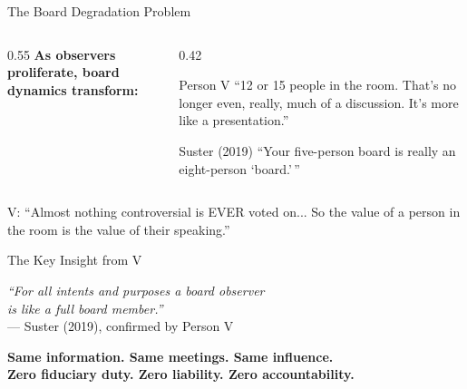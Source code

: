 \documentclass[aspectratio=169,12pt]{beamer}
\begin{document}
\begin{frame}{The Board Degradation Problem}
\begin{columns}
\begin{column}{0.55\textwidth}
\textbf{As observers proliferate, board dynamics transform:}
\vspace{0.5em}

\end{column}
\begin{column}{0.42\textwidth}
\begin{block}{Person V}
\small
``12 or 15 people in the room. That's no longer even, really, much of a discussion. It's more like a presentation.''
\end{block}
\vspace{0.3em}
\begin{block}{Suster (2019)}
\small
``Your five-person board is really an eight-person `board.'\,''
\end{block}
\end{column}
\end{columns}
\vspace{0.5em}
\begin{center}
\small V: ``Almost nothing controversial is EVER voted on... So the value of a person in the room is the value of their speaking.''
\end{center}
\end{frame}

\begin{frame}{The Key Insight from V}
\begin{center}
\Large
\textit{``For all intents and purposes a board observer\\ is like a full board member.''}\\[8pt]
\normalsize --- Suster (2019), confirmed by Person V
\end{center}
\vspace{1em}
\begin{center}
\textbf{Same information. Same meetings. Same influence.}\\[6pt]
\textcolor{harvardcrimson}{\textbf{Zero fiduciary duty. Zero liability. Zero accountability.}}
\end{center}
\end{frame}
\end{document}
